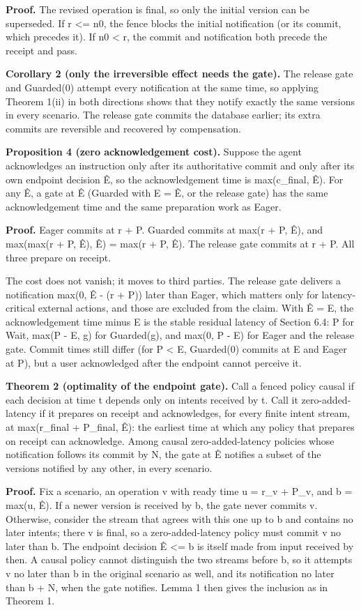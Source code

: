 \documentclass[11pt]{article}
\begin{document}
\textbf{Proof.} The revised operation is final, so only the initial version can be superseded. If r <= n0, the fence blocks the initial notification (or its commit, which precedes it). If n0 < r, the commit and notification both precede the receipt and pass.


\textbf{Corollary 2 (only the irreversible effect needs the gate).} The release gate and Guarded(0) attempt every notification at the same time, so applying Theorem 1(ii) in both directions shows that they notify exactly the same versions in every scenario. The release gate commits the database earlier; its extra commits are reversible and recovered by compensation.


\textbf{Proposition 4 (zero acknowledgement cost).} Suppose the agent acknowledges an instruction only after its authoritative commit and only after its own endpoint decision Ê, so the acknowledgement time is max(c\_\allowbreak{}final, Ê). For any Ê, a gate at Ê (Guarded with E = Ê, or the release gate) has the same acknowledgement time and the same preparation work as Eager.


\textbf{Proof.} Eager commits at r + P. Guarded commits at max(r + P, Ê), and max(max(r + P, Ê), Ê) = max(r + P, Ê). The release gate commits at r + P. All three prepare on receipt.


The cost does not vanish; it moves to third parties. The release gate delivers a notification max(0, Ê - (r + P)) later than Eager, which matters only for latency-critical external actions, and those are excluded from the claim. With Ê = E, the acknowledgement time minus E is the stable residual latency of Section 6.4: P for Wait, max(P - E, g) for Guarded(g), and max(0, P - E) for Eager and the release gate. Commit times still differ (for P < E, Guarded(0) commits at E and Eager at P), but a user acknowledged after the endpoint cannot perceive it.


\textbf{Theorem 2 (optimality of the endpoint gate).} Call a fenced policy causal if each decision at time t depends only on intents received by t. Call it zero-added-latency if it prepares on receipt and acknowledges, for every finite intent stream, at max(r\_\allowbreak{}final + P\_\allowbreak{}final, Ê): the earliest time at which any policy that prepares on receipt can acknowledge. Among causal zero-added-latency policies whose notification follows its commit by N, the gate at Ê notifies a subset of the versions notified by any other, in every scenario.


\textbf{Proof.} Fix a scenario, an operation v with ready time u = r\_\allowbreak{}v + P\_\allowbreak{}v, and b = max(u, Ê). If a newer version is received by b, the gate never commits v. Otherwise, consider the stream that agrees with this one up to b and contains no later intents; there v is final, so a zero-added-latency policy must commit v no later than b. The endpoint decision Ê <= b is itself made from input received by then. A causal policy cannot distinguish the two streams before b, so it attempts v no later than b in the original scenario as well, and its notification no later than b + N, when the gate notifies. Lemma 1 then gives the inclusion as in Theorem 1.
\end{document}
